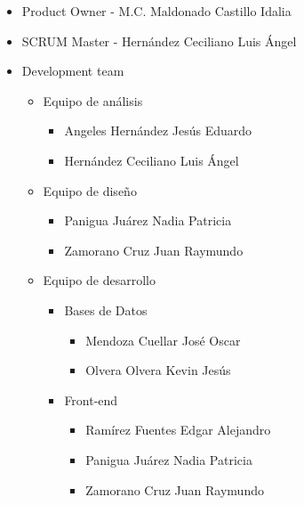 \documentclass[12pt,letterpaper]{article}
\begin{document}
                \begin{itemize}
                    \item Product Owner - M.C. Maldonado Castillo Idalia 
                    \item SCRUM Master - Hernández Ceciliano Luis Ángel 
                    \item Development team
                        \begin{itemize}
                            \item Equipo de análisis
                                \begin{itemize}
                                    \item Angeles Hernández Jesús Eduardo
                                    \item Hernández Ceciliano Luis Ángel
                                \end{itemize}
                            \item Equipo de diseño
                            \begin{itemize}
                                \item Panigua Juárez Nadia Patricia
                                \item Zamorano Cruz Juan Raymundo
                            \end{itemize}
                            \item Equipo de desarrollo
                            \begin{itemize}
                                \item Bases de Datos
                                    \begin{itemize}
                                        \item Mendoza Cuellar José Oscar
                                        \item Olvera Olvera Kevin Jesús
                                    \end{itemize}
                                \item Front-end
                                \begin{itemize}
                                    \item Ramírez Fuentes Edgar Alejandro
                                    \item Panigua Juárez Nadia Patricia
                                    \item Zamorano Cruz Juan Raymundo

\end{itemize}
\end{itemize}
\end{itemize}
\end{itemize}
\end{document}
